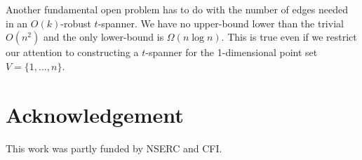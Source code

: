 \documentclass{patmorin}
\begin{document}
Another fundamental open problem has to do with the number of edges needed
in an $O(k)$-robust $t$-spanner.  We have no upper-bound lower than the
trivial $O(n^2)$ and the only lower-bound is $\Omega(n\log n)$.  This is
true even if we restrict our attention to constructing a $t$-spanner
for the 1-dimensional point set $V=\{1,\ldots,n\}$.

\section*{Acknowledgement}

This work was partly funded by NSERC and CFI.



\end{document}
